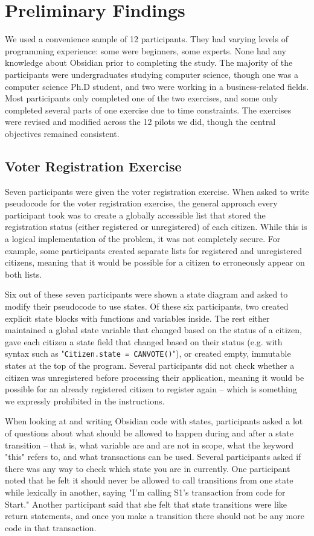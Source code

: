 \documentclass[sigplan,10pt,review]{acmart}\settopmatter{printfolios=true}
\begin{document}
\section{Preliminary Findings}

We used a convenience sample of 12 participants. They had varying levels of programming experience: some were beginners, some 
experts. None had any knowledge about Obsidian prior to completing the study. The majority of the participants were undergraduates 
studying computer science, though one was a computer science Ph.D student, and two were working in a business-related fields. Most 
participants only completed one of the two exercises, and some only completed several parts of one exercise due to time constraints. The 
exercises were revised and modified across the 12 pilots we did, though the central objectives remained consistent. 

\subsection{Voter Registration Exercise}

Seven participants were given the voter registration exercise. When asked to write pseudocode for the voter registration exercise, the 
general approach every participant took was to create a globally accessible list that stored the registration status (either registered or 
unregistered) of each citizen. While this is a logical implementation of the problem, it was not completely secure. For example, some 
participants created separate lists for registered and unregistered citizens, meaning that it would be possible for a citizen to erroneously 
appear on both lists. 
 	
Six out of these seven participants were shown a state diagram and asked to modify their pseudocode to use states. Of these six 
participants, two created explicit state blocks with functions and variables inside. The rest either maintained a global state variable that 
changed based on the status of a citizen, gave each citizen a state field that changed based on their status (e.g. with syntax such as 
"\texttt{\small{Citizen.state = CANVOTE()}}"), or created empty, immutable states at the top of the program. Several participants did not check whether a 
citizen was unregistered before processing their application, meaning it would be possible for an already registered citizen to register again 
-- which is something we expressly prohibited in the instructions. 
	
When looking at and writing Obsidian code with states, participants asked a lot of questions about what should be allowed to happen 
during and after a state transition -- that is, what variable are and are not in scope, what the keyword "this" refers to, and what transactions 
can be used. Several participants asked if there was any way to check which state you are in currently. One participant noted that he felt it 
should never be allowed to call transitions from one state while lexically in another, saying "I'm calling S1's transaction from code for Start."
Another participant said that she felt that state transitions were like return statements, and once you make a transition there should not be 
any more code in that transaction. 
\end{document}
